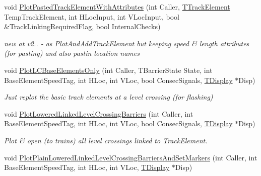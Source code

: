 \begin{DoxyCompactItemize}
\item 
\mbox{\label{class_t_track_a9f93210292bf2423e0ac0d738adafe9e}} 
void \mbox{\hyperlink{class_t_track_a9f93210292bf2423e0ac0d738adafe9e}{Plot\+Pasted\+Track\+Element\+With\+Attributes}} (int Caller, \mbox{\hyperlink{class_t_track_element}{T\+Track\+Element}} Temp\+Track\+Element, int H\+Loc\+Input, int V\+Loc\+Input, bool \&Track\+Linking\+Required\+Flag, bool Internal\+Checks)
\begin{DoxyCompactList}\small\item\em new at v2.. -\/ as Plot\+And\+Add\+Track\+Element but keeping speed \& length attributes (for pasting) and also pastin location names \end{DoxyCompactList}\item 
\mbox{\label{class_t_track_a9baeb3f155bea71ef42f09c276707562}} 
void \mbox{\hyperlink{class_t_track_a9baeb3f155bea71ef42f09c276707562}{Plot\+L\+C\+Base\+Elements\+Only}} (int Caller, T\+Barrier\+State State, int Base\+Element\+Speed\+Tag, int H\+Loc, int V\+Loc, bool Consec\+Signals, \mbox{\hyperlink{class_t_display}{T\+Display}} $\ast$Disp)
\begin{DoxyCompactList}\small\item\em Just replot the basic track elements at a level crossing (for flashing) \end{DoxyCompactList}\item 
\mbox{\label{class_t_track_aa0e977764887fba8aa0dab82ef0b957b}} 
void \mbox{\hyperlink{class_t_track_aa0e977764887fba8aa0dab82ef0b957b}{Plot\+Lowered\+Linked\+Level\+Crossing\+Barriers}} (int Caller, int Base\+Element\+Speed\+Tag, int H\+Loc, int V\+Loc, bool Consec\+Signals, \mbox{\hyperlink{class_t_display}{T\+Display}} $\ast$Disp)
\begin{DoxyCompactList}\small\item\em Plot \& open (to trains) all level crossings linked to Track\+Element. \end{DoxyCompactList}\item 
\mbox{\label{class_t_track_a85837fb5110486604fab79d42ec60db6}} 
void \mbox{\hyperlink{class_t_track_a85837fb5110486604fab79d42ec60db6}{Plot\+Plain\+Lowered\+Linked\+Level\+Crossing\+Barriers\+And\+Set\+Markers}} (int Caller, int Base\+Element\+Speed\+Tag, int H\+Loc, int V\+Loc, \mbox{\hyperlink{class_t_display}{T\+Display}} $\ast$Disp)

\end{DoxyCompactItemize}
